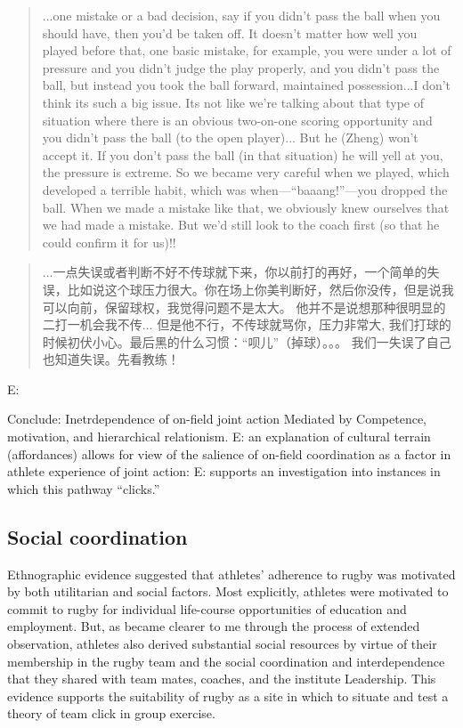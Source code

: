 \begin{CJK}{UTF8}{gbsn}
          \begin{quote}
             ...one mistake or a bad decision, say if you didn't pass the ball when you should have, then you'd be taken off.  It doesn't matter how well you played before that, one basic mistake, for example, you were under a lot of pressure and you didn't judge the play properly, and you didn't pass the ball, but instead you took the ball forward, maintained possession...I don't think its such a big issue.
             Its not like we're talking about that type of situation where there is an obvious two-on-one scoring opportunity and you didn't pass the ball (to the open player)...
             But he (Zheng) won't accept it.  If you don't pass the ball (in that situation) he will yell at you, the pressure is extreme.  So we became very careful when we played, which developed a terrible habit, which was when---``baaang!''---you dropped the ball. When we made a mistake like that, we obviously knew ourselves that we had made a mistake.  But we'd still look to the coach first (so that he could confirm it for us)!!
               \end{quote}

               \begin{quote}
                    ...一点失误或者判断不好不传球就下来，你以前打的再好，一个简单的失误，比如说这个球压力很大。你在场上你美判断好，然后你没传，但是说我可以向前，保留球权，我觉得问题不是太大。
                   他并不是说想那种很明显的二打一机会我不传...
                    但是他不行，不传球就骂你，压力非常大, 我们打球的时候初伏小心。最后黑的什么习惯：“呗儿”（掉球）。。。 我们一失误了自己也知道失误。先看教练！
              \end{quote}
       E:

Conclude:
Inetrdependence of on-field joint action
Mediated by Competence,
motivation,
and hierarchical relationism.
E: an explanation of cultural terrain (affordances) allows for view of the salience of on-field coordination as a factor in athlete experience of joint action:
E: supports an investigation into instances in which this pathway ``clicks.''



\subsection{Social coordination}

Ethnographic evidence suggested that athletes' adherence to rugby was motivated by both utilitarian and social factors.  Most explicitly, athletes were motivated to commit to rugby for individual life-course opportunities of education and employment.  But, as became clearer to me through the process of extended observation, athletes also derived substantial social resources by virtue of their membership in the rugby team and the social coordination and interdependence that they shared with team mates, coaches, and the institute Leadership.
This evidence supports the suitability of rugby as a site in which to situate and test a theory of team click in group exercise.


\end{CJK}
